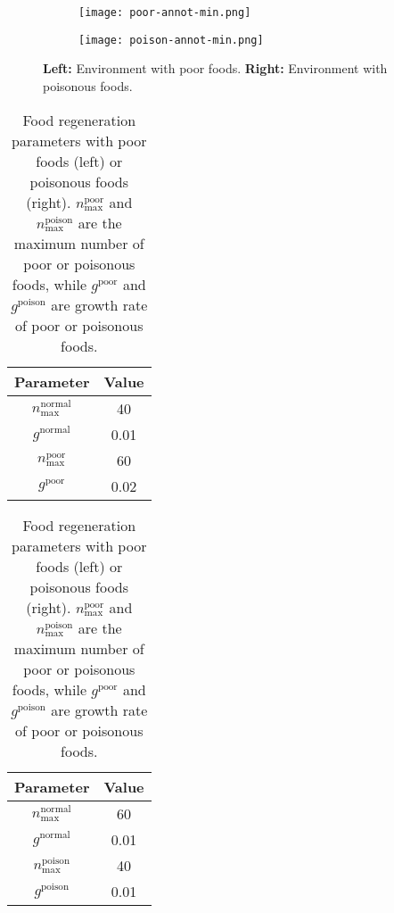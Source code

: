 \begin{figure}[t]
  \begin{subfigure}[t]{4cm}
    \centering
    \texttt{[image: poor-annot-min.png]}
  \end{subfigure}
  \begin{subfigure}[t]{4cm}
    \centering
    \texttt{[image: poison-annot-min.png]}
  \end{subfigure}
  \caption{
    \textbf{Left:} Environment with poor foods.
    \textbf{Right:} Environment with poisonous foods.
  }\label{figure:pp}
\end{figure}

\begin{table}[t]
  \begin{subtable}[h]{0.45\columnwidth}
    \centering
    \begin{tabular}{cc}
      \toprule
      Parameter & Value \\
      \midrule
      $n_{\textrm{max}}^{\textrm{normal}}$ & 40\\
      $g^{\textrm{normal}}$ & 0.01 \\
      $n_{\textrm{max}}^{\textrm{poor}}$ & 60 \\
      $g^{\textrm{poor}}$ & 0.02 \\
      \bottomrule
    \end{tabular}
  \end{subtable}
  \begin{subtable}[h]{0.45\columnwidth}
    \centering
    \begin{tabular}{cc}
      \toprule
      Parameter & Value \\
      \midrule
      $n_{\textrm{max}}^{\textrm{normal}}$ & 60\\
      $g^{\textrm{normal}}$ & 0.01 \\
      $n_{\textrm{max}}^{\textrm{poison}}$ & 40 \\
      $g^{\textrm{poison}}$ & 0.01 \\
      \bottomrule
    \end{tabular}
  \end{subtable}
  \caption{
    Food regeneration parameters with poor foods (left) or poisonous foods (right).
    $n_{\textrm{max}}^{\textrm{poor}}$ and $n_{\textrm{max}}^{\textrm{poison}}$ are the maximum number of poor or poisonous foods, while $g^{\textrm{poor}}$ and $g^{\textrm{poison}}$ are growth rate of poor or poisonous foods.
  }\label{table:pp}
\end{table}

